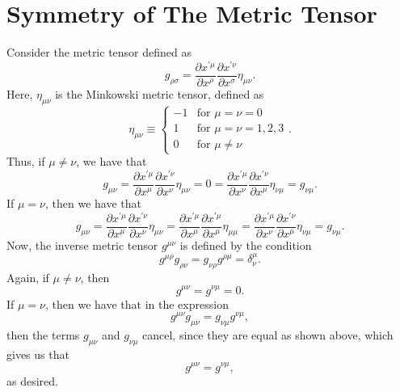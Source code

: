 \documentclass[12pt]{article}
\theoremstyle{definition}
\theoremstyle{remark}
\begin{document}
\section{Symmetry of The Metric Tensor}
	Consider the metric tensor defined as 
		\[
		g_{ \rho \sigma } =
		\frac{ \partial x^{ \prime \mu } }{ \partial x^{ \rho } } 
		\frac{ \partial x^{ \prime \nu } }{ \partial x^{ \sigma } } 
		\eta_{ \mu \nu } .
		\]
	Here, $\eta_{\mu \nu}$ is the Minkowski metric tensor, defined as
		\[
		\eta_{\mu \nu} 
		\equiv
		\begin{cases}
		-1 & \text{for} \,\, \mu = \nu = 0 \\
		1 & \text{for} \,\, \mu = \nu = 1,2,3 \\
		0 & \text{for} \,\, \mu \neq \nu
		\end{cases}.
		\]
	Thus, if $\mu \neq \nu$, we have that
		\[
		g_{ \mu \nu}
		 =  
		\frac{ \partial x^{ \prime \mu } }{ \partial x^{ \mu } } 
		\frac{ \partial x^{ \prime \nu } }{ \partial x^{ \nu } } 
		\eta_{ \mu \nu } 
		=
		0
		=
		\frac{ \partial x^{ \prime \mu } }{ \partial x^{ \nu } } 
		\frac{ \partial x^{ \prime \nu } }{ \partial x^{ \mu } } 
		\eta_{ \nu \mu } 
		=
		g_{\nu \mu}.
		\]
	If $\mu = \nu$, then we have that 
		\[
		g_{\mu \nu} 
		=
		\frac{ \partial x^{ \prime \mu } }{ \partial x^{ \mu } } 
		\frac{ \partial x^{ \prime \nu } }{ \partial x^{ \nu } } 
		\eta_{ \mu \nu } 
		=
		\frac{ \partial x^{ \prime \mu } }{ \partial x^{ \mu } } 
		\frac{ \partial x^{ \prime \mu } }{ \partial x^{ \mu } } 
		\eta_{ \mu \mu }
		=
		\frac{ \partial x^{ \prime \mu } }{ \partial x^{ \nu } } 
		\frac{ \partial x^{ \prime \nu } }{ \partial x^{ \mu } } 
		\eta_{ \nu \mu } 
		=
		g_{ \nu \mu} .
		\]
	Now, the inverse metric tensor $g^{\mu \nu}$ is defined by the condition 
		\[
		g^{ \mu \rho } g_{ \rho \nu } 
		= 
		g_{ \nu \rho } g^{ \rho \mu } 
		= 
		\delta_{ \nu }^{ \mu } .
		\]
	Again, if $\mu \neq \nu$, then 
		\[
		g^{ \mu \nu } = g^{ \nu \mu } = 0.
		\]
	If $\mu = \nu$, then we have that in the expression 
		\[
		g^{ \mu \nu} g_{ \mu \nu } 
		=
		g_{\nu \mu } g^{ \nu \mu },
		\]
	then the terms $g_{\mu \nu}$ and $g_{\nu \mu}$ cancel, since they are equal as shown above, which gives us that 
		\[
		g^{ \mu \nu } = g^{ \nu \mu },
		\]
	as desired.  
\end{document}
